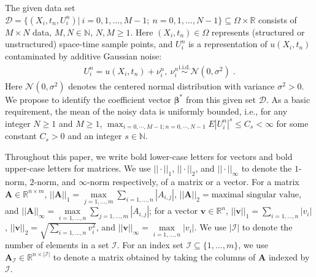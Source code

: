 \documentclass[a4paper,11pt]{article}
\newcommand{\bbeta}{\bm{\beta}}
\theoremstyle{definition}
\begin{document}
The given data set $\mathcal{D}=\{(X_i,t_n,U_i^n)|~i=0,1,\dots,M-1;~n=0,1,\dots,N-1\}\subseteq\Omega\times\mathbb{R}$ consists of $M\times N$ data, $M,N\in\mathbb{N}$, $N,M\geq 1$.  Here $(X_i,t_n)\in\Omega$ represents (structured or unstructured) space-time sample points, and $U_i^n$ is a representation of $u(X_i,t_n)$ contaminated by additive Gaussian noise:
\begin{align*}
U_i^n=	u(X_i,t_n)+\nu_i^n,~\nu_i^n\overset{\text{i.i.d.}}{\sim}\mathcal{N}(0,\sigma^2)\;.
\end{align*}
 Here $\mathcal{N}(0,\sigma^2)$ denotes the centered normal distribution with variance $\sigma^2>0$. We propose to identify the coefficient vector $\bbeta^*$ from this given set $\mathcal{D}$.  As a basic requirement, the mean of the noisy data is uniformly bounded, i.e., for any integer $N\geq 1$ and $M\geq 1$, $\max_{i=0,\cdots, M-1; n=0,\cdots,N-1}E|U_i^n|^s\leq C_s<\infty$ for some constant $C_s>0$ and an integer $s\in\mathbb{N}$.


Throughout this paper, we write bold lower-case letters for vectors and bold upper-case letters for matrices. We use $||\cdot||_1$, $||\cdot||_2$, and $||\cdot||_\infty$ to denote the $1$-norm, $2$-norm, and $\infty$-norm respectively, of  a matrix or a vector. For a matrix $\mathbf{A}\in\mathbb{R}^{n\times m}$, $||\mathbf{A}||_1=\underset{j=1,\dots,m}{\max}\sum_{i=1,\dots,n}|A_{i,j}|$, $||\mathbf{A}||_2=\text{maximal singular value}$, and $||\mathbf{A}||_\infty=\underset{i=1,\dots,n}{\max}\sum_{j=1,\dots,m}|A_{i,j}|$; for a vector $\mathbf{v}\in\mathbb{R}^n$, $||\mathbf{v}||_1=\underset{i=1,\dots,n}{\sum}|v_i|$, $||\mathbf{v}||_2=\sqrt{\underset{i=1,\dots,n}{\sum}v_i^2}$, and $||\mathbf{v}||_\infty=\underset{i=1,\dots,n}{\max}|v_i|$. We use $|\mathcal{I}|$ to denote the number of elements in a set $\mathcal{I}$. For an index set $\mathcal{I}\subseteq\{1,\dots,m\}$, we use $\mathbf{A}_\mathcal{I}\in\mathbb{R}^{n\times |\mathcal{I}|}$ to denote a matrix obtained by taking the columns of $\mathbf{A}$ indexed by $\mathcal{I}$.



\end{document}
